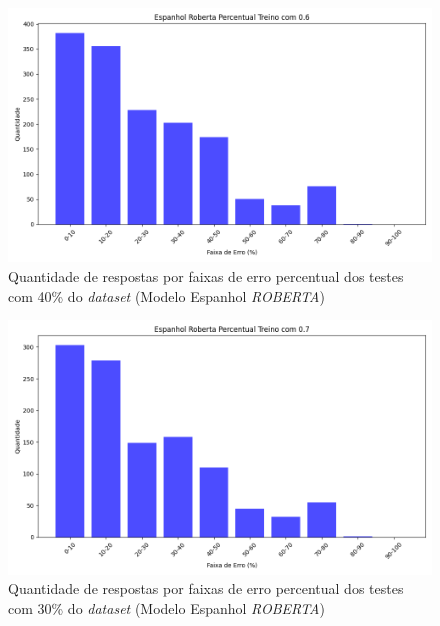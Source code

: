 \begin{figure}[h!]
\includegraphics[width=\textwidth]{img/grafsEsp/Espanhol Roberta Percentual Treino com 0.6_quantidade.png}
\caption{Quantidade de respostas por faixas de erro percentual dos testes com 40\% do \textit{dataset} (Modelo Espanhol \textit{ROBERTA})}\label{figure:12}
\end{figure}

\begin{figure}[h!]
\includegraphics[width=\textwidth]{img/grafsEsp/Espanhol Roberta Percentual Treino com 0.7_quantidade.png}
\caption{Quantidade de respostas por faixas de erro percentual dos testes com 30\% do \textit{dataset} (Modelo Espanhol \textit{ROBERTA})}\label{figure:13}
\end{figure}

